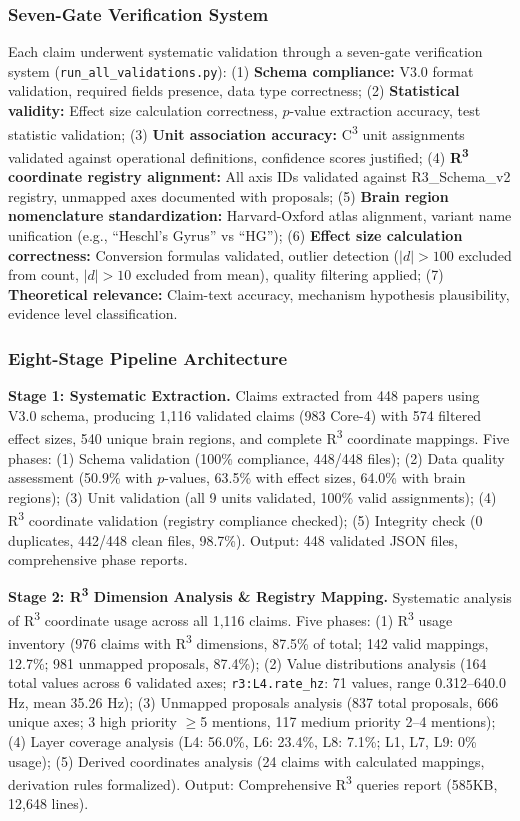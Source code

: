 \documentclass[9pt,onecolumn]{article}
\begin{document}
\subsubsection{Seven-Gate Verification System}

Each claim underwent systematic validation through a seven-gate verification system (\texttt{run\_all\_validations.py}): (1) \textbf{Schema compliance:} V3.0 format validation, required fields presence, data type correctness; (2) \textbf{Statistical validity:} Effect size calculation correctness, $p$-value extraction accuracy, test statistic validation; (3) \textbf{Unit association accuracy:} C\textsuperscript{3} unit assignments validated against operational definitions, confidence scores justified; (4) \textbf{R\textsuperscript{3} coordinate registry alignment:} All axis IDs validated against R3\_Schema\_v2 registry, unmapped axes documented with proposals; (5) \textbf{Brain region nomenclature standardization:} Harvard-Oxford atlas alignment, variant name unification (e.g., ``Heschl's Gyrus'' vs ``HG''); (6) \textbf{Effect size calculation correctness:} Conversion formulas validated, outlier detection ($|d| > 100$ excluded from count, $|d| > 10$ excluded from mean), quality filtering applied; (7) \textbf{Theoretical relevance:} Claim-text accuracy, mechanism hypothesis plausibility, evidence level classification.

\subsubsection{Eight-Stage Pipeline Architecture}

\textbf{Stage 1: Systematic Extraction.} Claims extracted from 448 papers using V3.0 schema, producing 1,116 validated claims (983 Core-4) with 574 filtered effect sizes, 540 unique brain regions, and complete R\textsuperscript{3} coordinate mappings. Five phases: (1) Schema validation (100\% compliance, 448/448 files); (2) Data quality assessment (50.9\% with $p$-values, 63.5\% with effect sizes, 64.0\% with brain regions); (3) Unit validation (all 9 units validated, 100\% valid assignments); (4) R\textsuperscript{3} coordinate validation (registry compliance checked); (5) Integrity check (0 duplicates, 442/448 clean files, 98.7\%). Output: 448 validated JSON files, comprehensive phase reports.

\textbf{Stage 2: R\textsuperscript{3} Dimension Analysis \& Registry Mapping.} Systematic analysis of R\textsuperscript{3} coordinate usage across all 1,116 claims. Five phases: (1) R\textsuperscript{3} usage inventory (976 claims with R\textsuperscript{3} dimensions, 87.5\% of total; 142 valid mappings, 12.7\%; 981 unmapped proposals, 87.4\%); (2) Value distributions analysis (164 total values across 6 validated axes; \texttt{r3:L4.rate\_hz}: 71 values, range 0.312--640.0 Hz, mean 35.26 Hz); (3) Unmapped proposals analysis (837 total proposals, 666 unique axes; 3 high priority $\geq$5 mentions, 117 medium priority 2--4 mentions); (4) Layer coverage analysis (L4: 56.0\%, L6: 23.4\%, L8: 7.1\%; L1, L7, L9: 0\% usage); (5) Derived coordinates analysis (24 claims with calculated mappings, derivation rules formalized). Output: Comprehensive R\textsuperscript{3} queries report (585KB, 12,648 lines).
\end{document}
